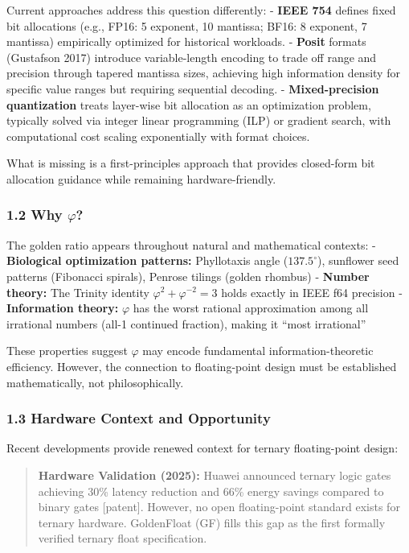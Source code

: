 Current approaches address this question differently: - \textbf{IEEE
754} defines fixed bit allocations (e.g., FP16: 5 exponent, 10 mantissa;
BF16: 8 exponent, 7 mantissa) empirically optimized for historical
workloads. - \textbf{Posit} formats (Gustafson 2017) introduce
variable-length encoding to trade off range and precision through
tapered mantissa sizes, achieving high information density for specific
value ranges but requiring sequential decoding. -
\textbf{Mixed-precision quantization} treats layer-wise bit allocation
as an optimization problem, typically solved via integer linear
programming (ILP) or gradient search, with computational cost scaling
exponentially with format choices.

What is missing is a first-principles approach that provides closed-form
bit allocation guidance while remaining hardware-friendly.

\subsubsection{\texorpdfstring{1.2 Why
\(\varphi\)?}{1.2 Why \textbackslash varphi?}}\label{why-varphi}

The golden ratio appears throughout natural and mathematical contexts: -
\textbf{Biological optimization patterns:} Phyllotaxis angle
(\(137.5^\circ\)), sunflower seed patterns (Fibonacci spirals), Penrose
tilings (golden rhombus) - \textbf{Number theory:} The Trinity identity
\(\varphi^2 + \varphi^{-2} = 3\) holds exactly in IEEE f64 precision -
\textbf{Information theory:} \(\varphi\) has the worst rational
approximation among all irrational numbers (all-1 continued fraction),
making it ``most irrational''

These properties suggest \(\varphi\) may encode fundamental
information-theoretic efficiency. However, the connection to
floating-point design must be established mathematically, not
philosophically.

\subsubsection{1.3 Hardware Context and
Opportunity}\label{hardware-context-and-opportunity}

Recent developments provide renewed context for ternary floating-point
design:

\begin{quote}
\textbf{Hardware Validation (2025):} Huawei announced ternary logic
gates achieving 30\% latency reduction and 66\% energy savings compared
to binary gates {[}patent{]}. However, no open floating-point standard
exists for ternary hardware. GoldenFloat (GF) fills this gap as the
first formally verified ternary float specification.
\end{quote}

